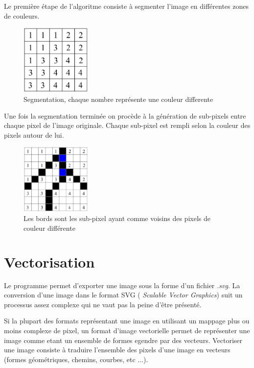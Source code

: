\documentclass[twoside,openright,a4paper,11pt,french]{article}
\begin{document}
Le première étape de l'algoritme consiste à segmenter l'image en
différentes zones de couleurs.

\begin{figure}[h]
\centering
\includegraphics[width=3.5cm]{./pics/cluster-edges1.eps}
\caption{Segmentation, chaque nombre représente une couleur differente}
\label{fig:routcidr}
\end{figure}

Une fois la segmentation terminée on procède à la génération de
sub-pixels entre chaque pixel de l'image originale. Chaque sub-pixel
est rempli selon la couleur des pixels autour de lui.

\begin{figure}[h]
\centering
\includegraphics[width=3.5cm]{./pics/cluster-edges2.eps}
\caption{Les bords sont les sub-pixel ayant comme voisins des pixels de
couleur différente}
\label{fig:routcidr}
\end{figure}


\section{Vectorisation} 
Le programme permet d'exporter une image sous la forme d'un fichier
{\it .svg}. La conversion d'une image dans le format SVG ({\it
Scalable Vector Graphics}) suit un processus assez complexe qui ne vaut
pas la peine d'être présenté.

Si la plupart des formats représentant une image en utilisant un 
mappage plus ou moins complexe de pixel, un format d'image vectorielle
permet de représenter une image comme etant un ensemble de formes
egendre par des vecteurs. Vectoriser une image consiste à traduire
l'ensemble des pixels d'une image en vecteurs (formes géométriques,
chemins, courbes, etc ...).
\end{document}

